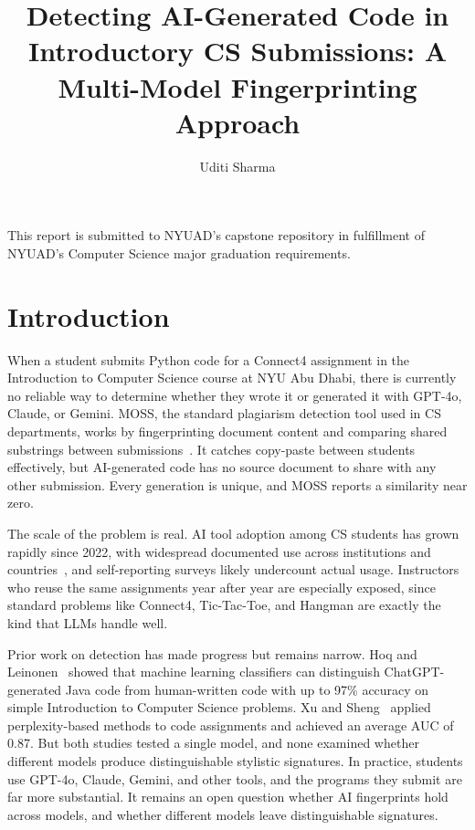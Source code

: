 \documentclass[sigconf]{acmart}
\title{Detecting AI-Generated Code in Introductory CS Submissions: A Multi-Model Fingerprinting Approach}
\author{Uditi Sharma}
\affiliation{
  \institution{New York University Abu Dhabi}
  \department{Computer Science}
}
\begin{document}
\maketitle

This report is submitted to NYUAD's capstone repository in fulfillment of NYUAD's Computer Science major graduation requirements.

\section{Introduction}

When a student submits Python code for a Connect4 assignment in the Introduction to Computer Science course at NYU Abu Dhabi, there is currently no reliable way to determine whether they wrote it or generated it with GPT-4o, Claude, or Gemini. MOSS, the standard plagiarism detection tool used in CS departments, works by fingerprinting document content and comparing shared substrings between submissions~\cite{schleimer2003winnowing}. It catches copy-paste between students effectively, but AI-generated code has no source document to share with any other submission. Every generation is unique, and MOSS reports a similarity near zero.

The scale of the problem is real. AI tool adoption among CS students has grown rapidly since 2022, with widespread documented use across institutions and countries~\cite{prather2023robots}, and self-reporting surveys likely undercount actual usage. Instructors who reuse the same assignments year after year are especially exposed, since standard problems like Connect4, Tic-Tac-Toe, and Hangman are exactly the kind that LLMs handle well.

Prior work on detection has made progress but remains narrow. Hoq and Leinonen~\cite{hoq2024detecting} showed that machine learning classifiers can distinguish ChatGPT-generated Java code from human-written code with up to 97\% accuracy on simple Introduction to Computer Science problems. Xu and Sheng~\cite{xu2024detecting} applied perplexity-based methods to code assignments and achieved an average AUC of 0.87. But both studies tested a single model, and none examined whether different models produce distinguishable stylistic signatures. In practice, students use GPT-4o, Claude, Gemini, and other tools, and the programs they submit are far more substantial. It remains an open question whether AI fingerprints hold across models, and whether different models leave distinguishable signatures.
\end{document}
